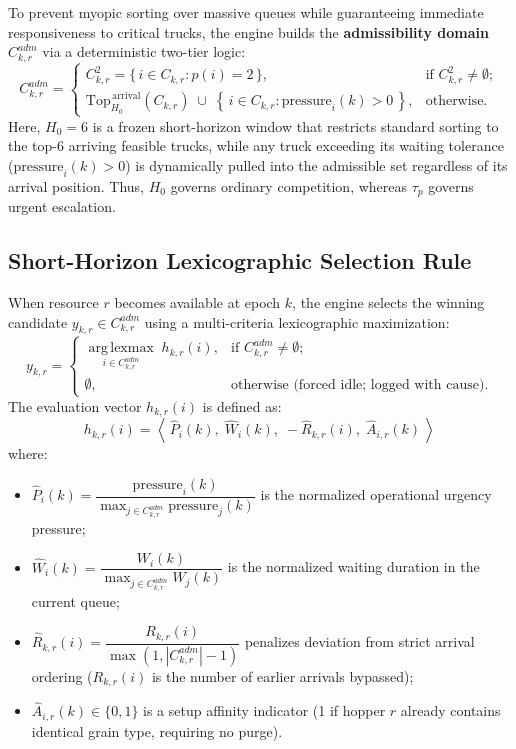 \documentclass[12pt,a4paper]{article}
\begin{document}
To prevent myopic sorting over massive queues while guaranteeing immediate responsiveness to critical trucks, the engine builds the \textbf{admissibility domain} $C^{adm}_{k,r}$ via a deterministic two-tier logic:
\begin{equation}
  C^{adm}_{k,r} =
  \begin{cases}
    C^{2}_{k,r} = \{\, i \in C_{k,r} : p(i) = 2 \,\}, & \text{if } C^{2}_{k,r} \neq \emptyset; \\[4pt]
    \mathrm{Top}^{\,\text{arrival}}_{H_0}(C_{k,r}) \;\cup\; \left\{\, i \in C_{k,r} : \mathrm{pressure}_i(k) > 0 \,\right\}, & \text{otherwise.}
  \end{cases}
  \label{eq:cadm}
\end{equation}
Here, $H_0 = 6$ is a frozen short-horizon window that restricts standard sorting to the top-6 arriving feasible trucks, while any truck exceeding its waiting tolerance ($\mathrm{pressure}_i(k) > 0$) is dynamically pulled into the admissible set regardless of its arrival position. Thus, $H_0$ governs ordinary competition, whereas $\tau_p$ governs urgent escalation.

\subsection{Short-Horizon Lexicographic Selection Rule}
When resource $r$ becomes available at epoch $k$, the engine selects the winning candidate $y_{k,r} \in C^{adm}_{k,r}$ using a multi-criteria lexicographic maximization:
\begin{equation}
  y_{k,r} =
  \begin{cases}
    \displaystyle \operatorname*{arg\,lexmax}_{i \in C^{adm}_{k,r}} \; h_{k,r}(i), & \text{if } C^{adm}_{k,r} \neq \emptyset; \\[6pt]
    \emptyset, & \text{otherwise (forced idle; logged with cause).}
  \end{cases}
  \label{eq:lexmax}
\end{equation}
The evaluation vector $h_{k,r}(i)$ is defined as:
\begin{equation}
  h_{k,r}(i) = \left\langle\, \hat{P}_i(k),\; \hat{W}_i(k),\; -\hat{R}_{k,r}(i),\; \hat{A}_{i,r}(k) \,\right\rangle
\end{equation}
where:
\begin{itemize}[leftmargin=1.2cm,itemsep=0pt,topsep=2pt]
  \item $\hat{P}_i(k) = \dfrac{\mathrm{pressure}_i(k)}{\max_{j \in C^{adm}_{k,r}} \mathrm{pressure}_j(k)}$ is the normalized operational urgency pressure;
  \item $\hat{W}_i(k) = \dfrac{W_i(k)}{\max_{j \in C^{adm}_{k,r}} W_j(k)}$ is the normalized waiting duration in the current queue;
  \item $\hat{R}_{k,r}(i) = \dfrac{R_{k,r}(i)}{\max(1, |C^{adm}_{k,r}| - 1)}$ penalizes deviation from strict arrival ordering ($R_{k,r}(i)$ is the number of earlier arrivals bypassed);
  \item $\hat{A}_{i,r}(k) \in \{0, 1\}$ is a setup affinity indicator (1 if hopper $r$ already contains identical grain type, requiring no purge).
\end{itemize}
\end{document}
